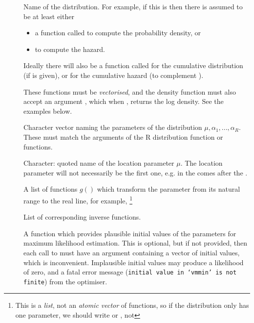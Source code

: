 \documentclass[nojss,nofooter]{jss}
\begin{document}
\begin{description}
\item[] Name of the distribution.  For example, if this is  then there is assumed to be at least either 
  
  \begin{itemize}
  \item  a function called  to compute the probability density, or 
  \item {} to compute the hazard.  
  \end{itemize}
  
  Ideally there will also be a function called  for the
  cumulative distribution (if  is given), or  for the
  cumulative hazard (to complement ).
  
  These functions must be \emph{vectorised}, and the density function
  must also accept an argument , which when ,
  returns the log density.  See the examples below.
  
\item[] Character vector naming the parameters of the
  distribution $\mu,\alpha_1,...,\alpha_R$.  These must match the
  arguments of the R distribution function or functions.
  
\item[] Character: quoted name of the location parameter $\mu$.
  The location parameter will not necessarily be the first one, e.g. 
  in  the  comes after the .
  
\item[] A list of functions $g()$ which transform the parameter from its natural range to the real line, for example,  \footnote{This is a \emph{list}, not an \emph{atomic vector} of functions, so if the distribution only has one parameter, we should write  or , not }

\item[] List of corresponding inverse functions.

\item[] A function which provides plausible initial values
  of the parameters for maximum likelihood estimation.  This is
  optional, but if not provided, then each call to 
  must have an  argument containing a vector of initial
  values, which is inconvenient.  Implausible initial values may
  produce a likelihood of zero, and a fatal error message
  (\texttt{initial value in `vmmin' is not finite}) from the
  optimiser.
  

\end{description}
\end{document}
